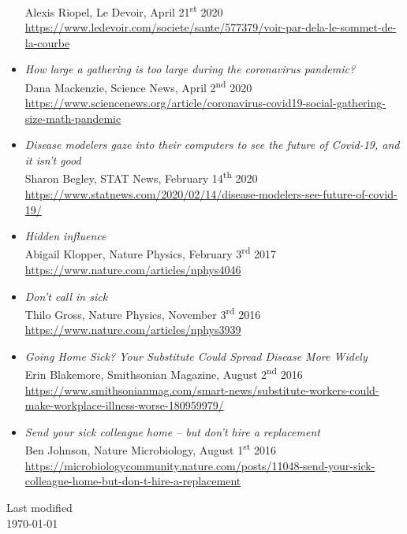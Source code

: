 \documentclass[11pt]{article}
\begin{document}
\begin{itemize}[itemsep=0.5em, first*=\small]
{  {\small Alexis Riopel, Le Devoir, April 21\textsuperscript{st} 2020}\\
  \footnotesize\url{https://www.ledevoir.com/societe/sante/577379/voir-par-dela-le-sommet-de-la-courbe}}
%
  \item \parbox[t]{0.9\textwidth}{\textit{How large a gathering is too large during the coronavirus pandemic?}\\
  {\small Dana Mackenzie, Science News, April 2\textsuperscript{nd} 2020}\\
  \footnotesize\url{https://www.sciencenews.org/article/coronavirus-covid19-social-gathering-size-math-pandemic}}
%
  \item \parbox[t]{0.9\textwidth}{\textit{Disease modelers gaze into their computers to see the future of Covid-19, and it isn’t good}\\
  {\small Sharon Begley, STAT News, February 14\textsuperscript{th} 2020}\\
  \footnotesize\url{https://www.statnews.com/2020/02/14/disease-modelers-see-future-of-covid-19/}}
%
  \item \parbox[t]{0.9\textwidth}{\textit{Hidden influence}\\
  {\small Abigail Klopper, Nature Physics, February 3\textsuperscript{rd} 2017}\\
  \footnotesize\url{https://www.nature.com/articles/nphys4046}}
%
  \item \parbox[t]{0.9\textwidth}{\textit{Don't call in sick}\\
  {\small Thilo Gross, Nature Physics, November 3\textsuperscript{rd} 2016}\\
  \footnotesize\url{https://www.nature.com/articles/nphys3939}}
%
  \item \parbox[t]{0.9\textwidth}{\textit{Going Home Sick? Your Substitute Could Spread Disease More Widely}\\
  {\small Erin Blakemore, Smithsonian Magazine, August 2\textsuperscript{nd} 2016}\\
  \footnotesize\url{https://www.smithsonianmag.com/smart-news/substitute-workers-could-make-workplace-illness-worse-180959979/}}
%
  \item \parbox[t]{0.9\textwidth}{\textit{Send your sick colleague home -- but don’t hire a replacement}\\
  {\small Ben Johnson, Nature Microbiology, August 1\textsuperscript{st} 2016}\\
  \footnotesize\url{https://microbiologycommunity.nature.com/posts/11048-send-your-sick-colleague-home-but-don-t-hire-a-replacement}}
%
\end{itemize}
%
%
%
%
%
\vfill
%
\begin{flushright}
  \tiny Last modified\\ \today
\end{flushright}
%
\end{document}
